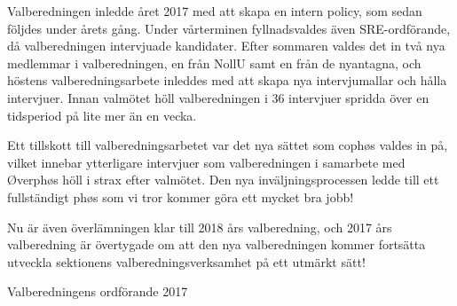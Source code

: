 \documentclass[../_main/handlingar.tex]{subfiles}
\begin{document}
Valberedningen inledde året 2017 med att skapa en intern policy, som sedan följdes under årets gång. Under vårterminen fyllnadsvaldes även SRE-ordförande, då valberedningen intervjuade kandidater. Efter sommaren valdes det in två nya medlemmar i valberedningen, en från NollU samt en från de nyantagna, och höstens valberedningsarbete inleddes med att skapa nya intervjumallar och hålla intervjuer. Innan valmötet höll valberedningen i 36 intervjuer spridda över en tidsperiod på lite mer än en vecka.

Ett tillskott till valberedningsarbetet var det nya sättet som cophøs valdes in på, vilket innebar ytterligare intervjuer som valberedningen i samarbete med Øverphøs höll i strax efter valmötet. Den nya inväljningsprocessen ledde till ett fullständigt phøs som vi tror kommer göra ett mycket bra jobb!

Nu är även överlämningen klar till 2018 års valberedning, och 2017 års valberedning är övertygade om att den nya valberedningen kommer fortsätta utveckla sektionens valberedningsverksamhet på ett utmärkt sätt!

\begin{signatures}{1}
    \mvh
    \signature{Christian Benson}{Valberedningens ordförande 2017}
\end{signatures}
\end{document}
